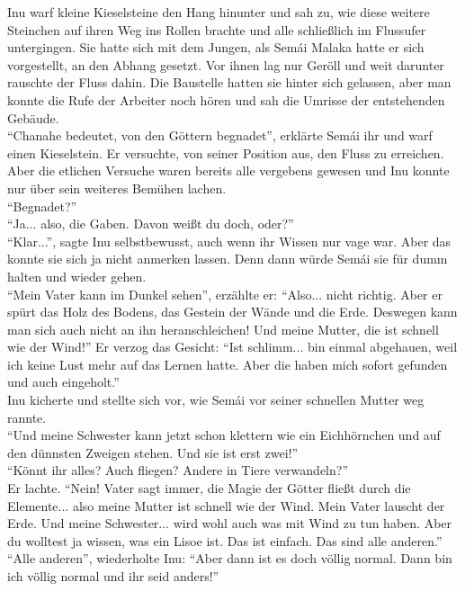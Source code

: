 Inu warf kleine Kieselsteine den Hang hinunter und sah zu, wie diese weitere Steinchen auf ihren 
Weg ins Rollen brachte und alle schließlich im Flussufer untergingen. Sie hatte sich mit dem 
Jungen, als Semái Malaka hatte er sich vorgestellt, an den Abhang gesetzt. Vor ihnen lag nur Geröll 
und weit darunter rauschte der Fluss dahin. Die Baustelle hatten sie hinter sich gelassen, aber man 
konnte die Rufe der Arbeiter noch hören und sah die Umrisse der entstehenden Gebäude. \\
``Chanahe bedeutet, von den Göttern begnadet'', erklärte Semái ihr und warf einen Kieselstein. Er 
versuchte, von seiner Position aus, den Fluss zu erreichen. Aber die etlichen Versuche waren 
bereits alle vergebens gewesen und Inu konnte nur über sein weiteres Bemühen lachen. \\
``Begnadet?''\\
``Ja... also, die Gaben. Davon weißt du doch, oder?''\\
``Klar...'', sagte Inu selbstbewusst, auch wenn ihr Wissen nur vage war. Aber das konnte sie sich 
ja nicht anmerken lassen. Denn dann würde Semái sie für dumm halten und wieder gehen. \\
``Mein Vater kann im Dunkel sehen'', erzählte er: ``Also... nicht richtig. Aber er spürt das Holz 
des Bodens, das Gestein der Wände und die Erde. Deswegen kann man sich auch nicht an ihn 
heranschleichen! Und meine Mutter, die ist schnell wie der Wind!'' Er verzog das Gesicht: ``Ist 
schlimm... bin einmal abgehauen, weil ich keine Lust mehr auf das Lernen hatte. Aber die haben mich 
sofort gefunden und auch eingeholt.''\\
Inu kicherte und stellte sich vor, wie Semái vor seiner schnellen Mutter weg rannte. \\
``Und meine Schwester kann jetzt schon klettern wie ein Eichhörnchen und auf den dünnsten Zweigen 
stehen. Und sie ist erst zwei!''\\
``Könnt ihr alles? Auch fliegen? Andere in Tiere verwandeln?''\\
Er lachte. ``Nein! Vater sagt immer, die Magie der Götter fließt durch die Elemente... also meine 
Mutter ist schnell wie der Wind. Mein Vater lauscht der Erde. Und meine Schwester... wird wohl auch 
was mit Wind zu tun haben. Aber du wolltest ja wissen, was ein Lisoe ist. Das ist einfach. Das sind 
alle anderen.''\\
``Alle anderen'', wiederholte Inu: ``Aber dann ist es doch völlig normal. Dann bin ich völlig 
normal und ihr seid anders!''\\
